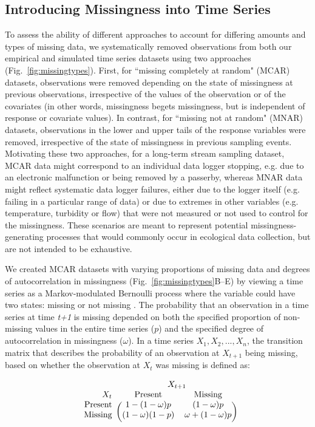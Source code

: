 \documentclass{article}
\begin{document}
\begin{linenumbers}
\subsection*{Introducing Missingness into Time Series}

To assess the ability of different approaches to account for differing amounts and types of missing data, we systematically removed observations from both our empirical and simulated time series datasets using two approaches (Fig.\ \ref{fig:missingtypes}). First, for ``missing completely at random" (MCAR) datasets, observations were removed depending on the state of missingness at previous observations, irrespective of the values of the observation or of the covariates (in other words, missingness begets missingness, but is independent of response or covariate values). In contrast, for ``missing not at random" (MNAR) datasets, observations in the lower and upper tails of the response variables were removed, irrespective of the state of missingness in previous sampling events. Motivating these two approaches, for a long-term stream sampling dataset, MCAR data might correspond to an individual data logger stopping, e.g. due to an electronic malfunction or being removed by a passerby, whereas MNAR data might reflect systematic data logger failures, either due to the logger itself (e.g. failing in a particular range of data) or due to extremes in other variables (e.g. temperature, turbidity or flow) that were not measured or not used to control for the missingness. These scenarios are meant to represent potential missingness-generating processes that would commonly occur in ecological data collection, but are not intended to be exhaustive.

We created MCAR datasets with varying proportions of missing data and degrees of autocorrelation in missingness (Fig.\ \ref{fig:missingtypes}B--E) by viewing a time series as a Markov-modulated Bernoulli process where the variable could have two states: missing or not missing \citep{Gharib2014, Edwards1960}. The probability that an observation in a time series at time \textit{t+1} is missing depended on both the specified proportion of non-missing values in the entire time series ($p$) and the specified degree of autocorrelation in missingness ($\omega$). In a time series $X_1, X_2, ..., X_n$, the transition matrix that describes the probability of an observation at $X_{t+1}$ being missing, based on whether the observation at $X_t$ was missing is defined as: 

\begin{equation}
\begin{blockarray}{rcccc}
\text{} & \BAmulticolumn{4}{c}{X_{t+1}}\\
X_t & \text{Present} & \text{Missing}  \\
\begin{block}{r(cccc)}
\text{Present} & 1-(1-\omega)p & (1-\omega)p \\
\text{Missing} & (1-\omega)(1-p) & \omega + (1-\omega)p  \\
[1ex]
\end{block}
\end{blockarray}
\end{equation}




\end{linenumbers}
\end{document}
